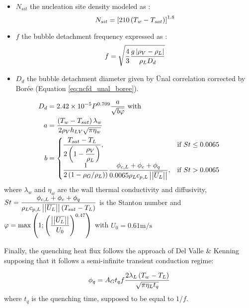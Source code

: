 \begin{itemize}
\item $N_{sit}$ the nucleation site density modeled as \cite{lemmert_influence_1977}:
\begin{equation}
N_{sit}=\left[ 210\left( T_{w}-T_{sat} \right)  \right]^{1.8}
\label{eq:nsit_NCFD}
\end{equation}

\item $f$ the bubble detachment frequency expressed as \cite{cole_bubble_1967}: 
\begin{equation}
f=\sqrt{\frac{4}{3}\frac{g\left| \rho_{V}-\rho_{L} \right| }{\rho_{L}D_{d}}}
\end{equation}

\item $D_{d}$ the bubble detachment diameter given by \"Unal correlation \cite{unal_maximum_1976} corrected by Bor\'ee \etal \cite{boree_ecoulements_1992} (Equation \ref{eq:ncfd_unal_boree}).

\end{itemize}



\begin{align}
D_{d}&=2.42\times 10^{-5} P^{0.709} \frac{a}{\sqrt{b\varphi}}\text{ with }
  \label{eq:ncfd_unal_boree}\\
 a&=\frac{\left( T_{w}-T_{sat} \right) \lambda_{w}}{2\rho_{V}h_{LV}\sqrt{\pi\eta_{w}}}\\
  b&=\begin{cases}
    \dfrac{T_{sat}-T_{L}}{2 \left( 1-\dfrac{\rho_{V}}{\rho_{L}}  \right)}, & \text{if $St\leq0.0065$}\\
    \dfrac{1}{2 \left( 1-\rho_{G}/\rho_{L}  \right))}\dfrac{\phi_{c,L}+\phi_{e}+\phi_{q}}{0.0065\rho_{L}c_{p,L}\left|\left|{\overline{U_{L}}}\right|\right|}, & \text{\text{if $St>0.0065$}}
    \end{cases}
\end{align}
where $\lambda_{w}$ and $\eta_{w}$ are the wall thermal conductivity and diffusivity, $St=\dfrac{\phi_{c,L}+\phi_{e}+\phi_{q}}{\rho_{L}c_{p,L}\left|\left|{\overline{U_{L}}}\right|\right|\left( T_{sat}-T_{L}  \right)}$ is the Stanton number and $\varphi=\displaystyle \mathrm{max}\left( 1 ; \left( \frac{\left|\left|{\overline{U_{L}}}\right|\right|}{U_{0}}  \right)^{0.47}  \right)$ with $U_{0}=0.61\text{m/s}$

\npar

Finally, the quenching heat flux follows the approach of {Del Valle} \& {Kenning} \cite{del_valle_subcooled_1985} supposing that it follows a semi-infinite transient conduction regime: 

\begin{equation}
\phi_{q}=A_{G}t_{q}f\frac{2\lambda_{L} \left( T_{w}-T_{L} \right)}{\sqrt{\pi \eta_{L}t_{q}}}
\label{eq:ncfd_phiq}
\end{equation} 
where $t_{q}$ is the quenching time, supposed to be equal to $1/f$.



